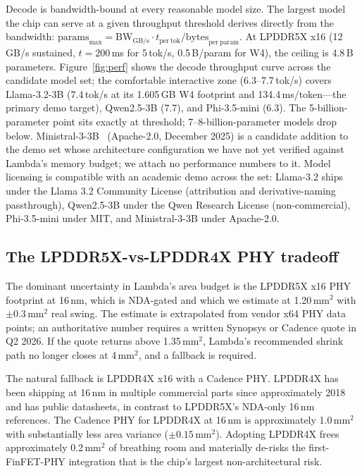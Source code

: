 \documentclass[conference]{IEEEtran}
\begin{document}
Decode is bandwidth-bound at every reasonable model size. The largest model the chip can serve at a given throughput threshold derives directly from the bandwidth: $\mathrm{params}_{\max} = \mathrm{BW}_{\mathrm{GB/s}} \cdot t_{\mathrm{per\ tok}} / \mathrm{bytes}_{\mathrm{per\ param}}$. At LPDDR5X x16 (12\,GB/s sustained, $t=200$\,ms for 5\,tok/s, 0.5\,B/param for W4), the ceiling is 4.8\,B parameters. Figure~\ref{fig:perf} shows the decode throughput curve across the candidate model set; the comfortable interactive zone (6.3--7.7\,tok/s) covers Llama-3.2-3B (7.4\,tok/s at its 1.605\,GB W4 footprint and 134.4\,ms/token---the primary demo target), Qwen2.5-3B (7.7), and Phi-3.5-mini (6.3). The 5-billion-parameter point sits exactly at threshold; 7--8-billion-parameter models drop below. Ministral-3-3B~\cite{ministral3} (Apache-2.0, December 2025) is a candidate addition to the demo set whose architecture configuration we have not yet verified against Lambda's memory budget; we attach no performance numbers to it. Model licensing is compatible with an academic demo across the set: Llama-3.2 ships under the Llama 3.2 Community License (attribution and derivative-naming passthrough), Qwen2.5-3B under the Qwen Research License (non-commercial), Phi-3.5-mini under MIT, and Ministral-3-3B under Apache-2.0.

\subsection{The LPDDR5X-vs-LPDDR4X PHY tradeoff}

The dominant uncertainty in Lambda's area budget is the LPDDR5X x16 PHY footprint at 16\,nm, which is NDA-gated and which we estimate at 1.20\,mm$^2$ with $\pm 0.3$\,mm$^2$ real swing. The estimate is extrapolated from vendor x64 PHY data points; an authoritative number requires a written Synopsys or Cadence quote in Q2 2026. If the quote returns above 1.35\,mm$^2$, Lambda's recommended shrink path no longer closes at 4\,mm$^2$, and a fallback is required.

The natural fallback is LPDDR4X x16 with a Cadence PHY. LPDDR4X has been shipping at 16\,nm in multiple commercial parts since approximately 2018 and has public datasheets, in contrast to LPDDR5X's NDA-only 16\,nm references. The Cadence PHY for LPDDR4X at 16\,nm is approximately 1.0\,mm$^2$ with substantially less area variance ($\pm 0.15$\,mm$^2$). Adopting LPDDR4X frees approximately 0.2\,mm$^2$ of breathing room and materially de-risks the first-FinFET-PHY integration that is the chip's largest non-architectural risk.
\end{document}
